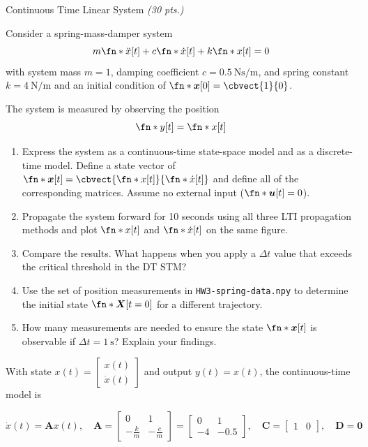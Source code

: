\begin{hwkProblem}{2}{Continuous Time Linear System \textit{(30 pts.)}} \label{hwk:p02}

	Consider a spring-mass-damper system
	\[
		m \fn*{\ddot{x}}[t] + c \fn*{\dot{x}}[t] + k \fn*{x}[t] = 0
	\]
	with system mass \(m = 1\), damping coefficient \(c = \qty{0.5}{\N\s\per\m}\), and spring constant \(k = \qty{4}{\N\per\m}\) and an initial condition of \(\fn*{\boldsymbol{x}}[0] = \cbvect{1}{0}\).

	The system is measured by observing the position
	\[
		\fn*{y}[t] = \fn*{x}[t]
	\]
	\begin{enumerate}[label=(\alph*)]
		\item \label{hwk:p02a} Express the system as a continuous-time state-space model and as a discrete-time model. Define a state vector of \(\fn*{\boldsymbol{x}}[t] = \cbvect{\fn*{x}[t]}{\fn*{\dot{x}}[t]}\) and define all of the corresponding matrices. Assume no external input (\(\fn*{\boldsymbol{u}}[t] = 0\)).
		\item \label{hwk:p02b} Propagate the system forward for 10 seconds using all three LTI propagation methods and plot \(\fn*{x}[t]\) and \(\fn*{\dot{x}}[t]\) on the same figure.
		\item \label{hwk:p02c} Compare the results. What happens when you apply a \(\Delta t\) value that exceeds the critical threshold in the DT STM?
		\item \label{hwk:p02d} Use the set of position measurements in \texttt{HW3-spring-data.npy} to determine the initial state \(\fn*{\boldsymbol{X}}[t=0]\) for a different trajectory.
		\item \label{hwk:p02e} How many measurements are needed to ensure the state \(\fn*{\boldsymbol{x}}[t]\) is observable if \(\Delta t=\qty{1}{\s}\)? Explain your findings.
	\end{enumerate}

	\hwkSol{} \label{hwk:s02}

	\hwkPart{} \label{hwk:s02a}

	With state \(x(t)=\left[\begin{array}{l}x(t) \\ \dot{x}(t)\end{array}\right]\) and output \(y(t)=x(t)\), the continuous-time model is

	\[
		\dot{x}(t)=\mathbf{A} x(t), \quad \mathbf{A}=\left[\begin{array}{cc}
				0            & 1            \\
				-\frac{k}{m} & -\frac{c}{m}
			\end{array}\right]=\left[\begin{array}{cc}
				0  & 1    \\
				-4 & -0.5
			\end{array}\right], \quad \mathbf{C}=\left[\begin{array}{ll}
				1 & 0
			\end{array}\right], \quad \mathbf{D}=\mathbf{0}
	\]


\end{hwkProblem}
